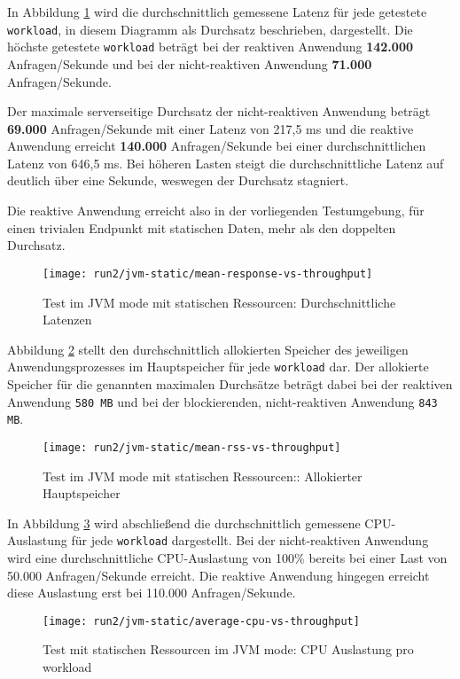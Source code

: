 In Abbildung \ref{fig:jvm_static_mean_response} wird die durchschnittlich gemessene Latenz für jede getestete \verb|workload|,
in diesem Diagramm als Durchsatz beschrieben, dargestellt.
Die höchste getestete \verb|workload| beträgt bei der reaktiven Anwendung \textbf{142.000} Anfragen/Sekunde und bei der
nicht-reaktiven Anwendung \textbf{71.000} Anfragen/Sekunde.

Der maximale serverseitige Durchsatz der nicht-reaktiven Anwendung beträgt \textbf{69.000} Anfragen/Sekunde mit einer
Latenz von 217,5 ms und
die reaktive Anwendung erreicht \textbf{140.000} Anfragen/Sekunde bei einer durchschnittlichen Latenz von 646,5 ms.
Bei höheren Lasten steigt die durchschnittliche Latenz auf deutlich über eine Sekunde, weswegen der Durchsatz stagniert.

Die reaktive Anwendung erreicht also in der vorliegenden Testumgebung, für einen trivialen
Endpunkt mit statischen Daten, mehr als den doppelten Durchsatz.
\newpage
\begin{figure}[ht!]
  \texttt{[image: run2/jvm-static/mean-response-vs-throughput]}
  \caption{Test im JVM mode mit statischen Ressourcen: Durchschnittliche Latenzen}
  \label{fig:jvm_static_mean_response}
\end{figure}
Abbildung \ref{fig:jvm_static_mean_rss} stellt den durchschnittlich allokierten Speicher des jeweiligen Anwendungsprozesses
im Hauptspeicher für jede \verb|workload| dar. Der allokierte Speicher für die genannten maximalen Durchsätze beträgt dabei bei
der reaktiven Anwendung \verb|580 MB| und bei der blockierenden, nicht-reaktiven Anwendung \verb|843 MB|.
\newpage
\begin{figure}[ht!]
  \texttt{[image: run2/jvm-static/mean-rss-vs-throughput]}
  \caption{Test im JVM mode mit statischen Ressourcen:: Allokierter Hauptspeicher}
  \label{fig:jvm_static_mean_rss}
\end{figure}
In Abbildung \ref{fig:jvm_static_avg_cpu} wird abschließend die durchschnittlich gemessene CPU-Auslastung für jede \verb|workload|
dargestellt. Bei der nicht-reaktiven Anwendung wird eine durchschnittliche CPU-Auslastung von 100\% bereits bei einer Last von
50.000 Anfragen/Sekunde erreicht. Die reaktive Anwendung hingegen erreicht diese Auslastung erst bei 110.000 Anfragen/Sekunde.
\newpage
\begin{figure}[ht!]
  \centering
  \texttt{[image: run2/jvm-static/average-cpu-vs-throughput]}
  \caption{Test mit statischen Ressourcen im JVM mode: CPU Auslastung pro workload}
  \label{fig:jvm_static_avg_cpu}
\end{figure}

